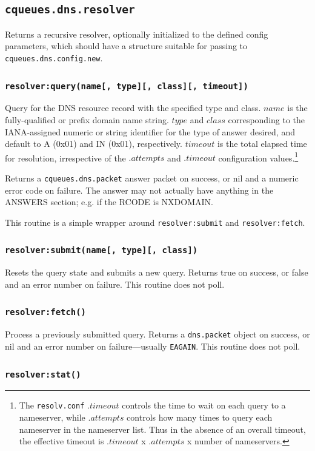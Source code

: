 \documentclass[11pt, oneside]{memoir}
\newcommand*{\fn}[1]{\texttt{#1}\xspace}
\newcommand*{\module}[1]{\texttt{#1}\xspace}
\newcounter{toccols}
\newenvironment{Module}[1]{
	\subsection{\texttt{#1}}
	\addtocontents{toc}{
		\protect\begin{multicols}{\value{toccols}}
	}
}{
	\addtocontents{toc}{\protect\end{multicols}}
}
\begin{document}
\begin{Module}{cqueues.dns.resolver}
Returns a recursive resolver, optionally initialized to the defined config parameters, which should have a structure suitable for passing to \fn{cqueues.dns.config.new}.

\subsubsection[\fn{resolver:query}]{\fn{resolver:query(name[, type][, class][, timeout])}}

Query for the DNS resource record with the specified type and class. $name$ is the fully-qualified or prefix domain name string. $type$ and $class$ corresponding to the IANA-assigned numeric or string identifier for the type of answer desired, and default to A (0x01) and IN (0x01), respectively. $timeout$ is the total elapsed time for resolution, irrespective of the $.attempts$ and $.timeout$ configuration values.\footnote{The \texttt{resolv.conf} $.timeout$ controls the time to wait on each query to a nameserver, while $.attempts$ controls how many times to query each nameserver in the nameserver list. Thus in the absence of an overall timeout, the effective timeout is $.timeout$ x $.attempts$ x number of nameservers.}

Returns a \module{cqueues.dns.packet} answer packet on success, or nil and a numeric error code on failure. The answer may not actually have anything in the ANSWERS section; e.g. if the RCODE is NXDOMAIN.

This routine is a simple wrapper around \fn{resolver:submit} and \fn{resolver:fetch}.

\subsubsection[\fn{resolver:submit}]{\fn{resolver:submit(name[, type][, class])}}

Resets the query state and submits a new query. Returns true on success, or false and an error number on failure. This routine does not poll.

\subsubsection[\fn{resolver:fetch}]{\fn{resolver:fetch()}}

Process a previously submitted query. Returns a \module{dns.packet} object on success, or nil and an error number on failure---usually \texttt{EAGAIN}. This routine does not poll.

\subsubsection[\fn{resolver:stat}]{\fn{resolver:stat()}}


\end{Module}
\end{document}

